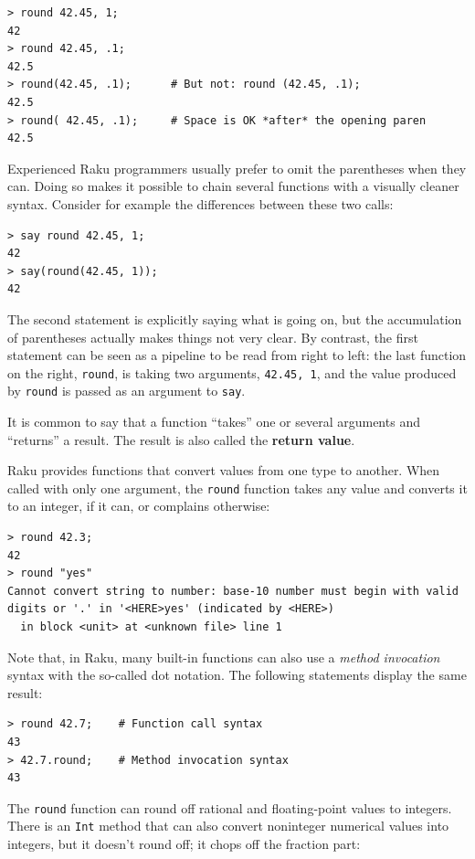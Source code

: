 \begin{verbatim}
> round 42.45, 1;
42
> round 42.45, .1;
42.5
> round(42.45, .1);      # But not: round (42.45, .1);
42.5
> round( 42.45, .1);     # Space is OK *after* the opening paren
42.5
\end{verbatim}

Experienced Raku programmers usually prefer to omit the parentheses 
when they can. Doing so makes it possible to chain several functions 
with a visually cleaner syntax. Consider for example the differences 
between these two calls:

\begin{verbatim}
> say round 42.45, 1;
42
> say(round(42.45, 1));
42
\end{verbatim}

The second statement is explicitly saying what is going on, but 
the accumulation of parentheses actually makes things 
not very clear. By contrast, the first statement can be seen 
as a pipeline to be read from right to left: the last function 
on the right, {\tt round}, is taking two arguments, 
{\tt 42.45, 1}, and the value produced by {\tt round} is 
passed as an argument to {\tt say}.

It is common to say that a function ``takes'' one or 
several arguments and ``returns'' a result.  The result is 
also called the {\bf return value}.

Raku provides functions that convert values from one type 
to another.  When called with only one argument, the 
{\tt round} function takes any value and converts it to an 
integer, if it can, or complains otherwise:

\begin{verbatim}
> round 42.3;
42
> round "yes"
Cannot convert string to number: base-10 number must begin with valid 
digits or '.' in '<HERE>yes' (indicated by <HERE>)
  in block <unit> at <unknown file> line 1
\end{verbatim}

%
Note that, in Raku, many built-in functions can also 
use a \emph{method invocation} syntax with the so-called 
dot notation. The following statements display the same result:
\begin{verbatim}
> round 42.7;    # Function call syntax
43
> 42.7.round;    # Method invocation syntax
43
\end{verbatim}
%
The {\tt round} function can round off rational and 
floating-point values to integers. There is an {\tt Int} 
method that can also convert noninteger numerical values 
into integers, but it doesn't round off; it chops off the 
fraction part:

